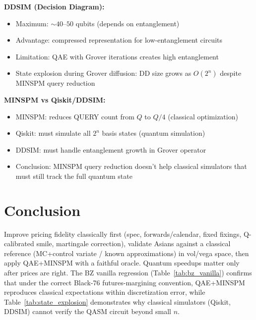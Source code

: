 \documentclass[11pt,a4paper]{article}
\begin{document}
\textbf{DDSIM (Decision Diagram):}
\begin{itemize}
    \item Maximum: $\sim40$–$50$ qubits (depends on entanglement)
    \item Advantage: compressed representation for low-entanglement circuits
    \item Limitation: QAE with Grover iterations creates high entanglement
    \item State explosion during Grover diffusion: DD size grows as $O(2^n)$ despite MINSPM query reduction
\end{itemize}

\textbf{MINSPM vs Qiskit/DDSIM:}
\begin{itemize}
    \item MINSPM: reduces QUERY count from $Q$ to $Q/4$ (classical optimization)
    \item Qiskit: must simulate all $2^n$ basis states (quantum simulation)
    \item DDSIM: must handle entanglement growth in Grover operator
    \item Conclusion: MINSPM query reduction doesn't help classical simulators that must still track the full quantum state
\end{itemize}

\section{Conclusion}
Improve pricing fidelity classically first (spec, forwards/calendar, fixed fixings, Q-calibrated smile, martingale correction), validate Asians against a classical reference (MC+control variate / known approximations) in vol/vega space, then apply QAE+MINSPM with a faithful oracle. Quantum speedups matter only after prices are right. The BZ vanilla regression (Table~\ref{tab:bz_vanilla}) confirms that under the correct Black-76 futures-margining convention, QAE+MINSPM reproduces classical expectations within discretization error, while Table~\ref{tab:state_explosion} demonstrates why classical simulators (Qiskit, DDSIM) cannot verify the QASM circuit beyond small $n$.
\end{document}
